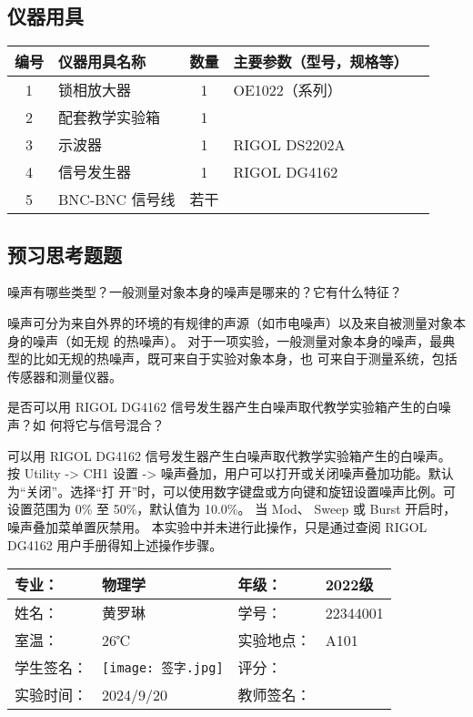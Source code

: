 \documentclass[dvipsnames, svgnames,a4paper,11pt]{article}
\begin{document}
	\subsection{仪器用具}
	\begin{center}
		\begin{tabular}{cm{4cm}cm{6cm}c}
				\hline
				编号 & 仪器用具名称 & 数量 & 主要参数（型号，规格等）  \\
				\hline
				1 & 锁相放大器 & 1 & OE1022（系列）   \\
				2 & 配套教学实验箱 & 1 &    \\
				3 & 示波器 & 1 & RIGOL DS2202A   \\
				4 & 信号发生器 & 1 & RIGOL DG4162  \\
				5 & BNC-BNC 信号线 & 若干 &    \\
				\hline
		\end{tabular}
		\end{center}
		

	
	
	
	\subsection{预习思考题题}
	
	\begin{question}
		噪声有哪些类型？一般测量对象本身的噪声是哪来的？它有什么特征？
	\end{question}
	噪声可分为来自外界的环境的有规律的声源（如市电噪声）以及来自被测量对象本身的噪声（如无规
的热噪声）。
对于一项实验，一般测量对象本身的噪声，最典型的比如无规的热噪声，既可来自于实验对象本身，也
可来自于测量系统，包括传感器和测量仪器。
	\begin{question}
		是否可以用 RIGOL DG4162 信号发生器产生白噪声取代教学实验箱产生的白噪声？如
何将它与信号混合？
	\end{question}
	可以用 RIGOL DG4162 信号发生器产生白噪声取代教学实验箱产生的白噪声。
按 Utility -> CH1 设置 -> 噪声叠加，用户可以打开或关闭噪声叠加功能。默认为“关闭”。选择“打
开”时，可以使用数字键盘或方向键和旋钮设置噪声比例。可设置范围为 0\% 至 50\%，默认值为 10.0\%。
当 Mod、 Sweep 或 Burst 开启时，噪声叠加菜单置灰禁用。
本实验中并未进行此操作，只是通过查阅 RIGOL DG4162 用户手册得知上述操作步骤。

	
	
	
	\clearpage
	\begin{table}
		\renewcommand\arraystretch{1.7}
		\centering
		\begin{tabularx}{\textwidth}{|X|X|X|X|}
			\hline
			专业： & 物理学 & 年级： & 2022级 \\
			\hline
			姓名： &黄罗琳 & 学号： & 22344001\\
			\hline
			室温： & 26℃ & 实验地点： & A101 \\
			\hline
			学生签名：& \texttt{[image: 签字.jpg]}  & 评分： &\\
			\hline
			实验时间：& 2024/9/20 & 教师签名：&\\
			\hline
		\end{tabularx}
	\end{table}
	
\end{document}
